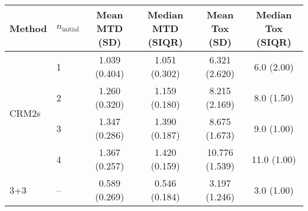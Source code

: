 \begin{tabular}{llcccc}
\toprule
Method & $n_{\text{initial}}$ & Mean MTD (SD)  & Median MTD (SIQR)  & Mean Tox (SD)  & Median Tox (SIQR)  \\
\midrule
\multirow{4}{*}{CRM2s} & 1 & 1.039 (0.404) & 1.051 (0.302) & 6.321 (2.620) & 6.0 (2.00) \\
 & 2 & 1.260 (0.320) & 1.159 (0.180) & 8.215 (2.169) & 8.0 (1.50) \\
 & 3 & 1.347 (0.286) & 1.390 (0.187) & 8.675 (1.673) & 9.0 (1.00) \\
 & 4 & 1.367 (0.257) & 1.420 (0.159) & 10.776 (1.539) & 11.0 (1.00) \\
\midrule
3+3 & -- & 0.589 (0.269) & 0.546 (0.184) & 3.197 (1.246) & 3.0 (1.00) \\
\bottomrule
\end{tabular}
